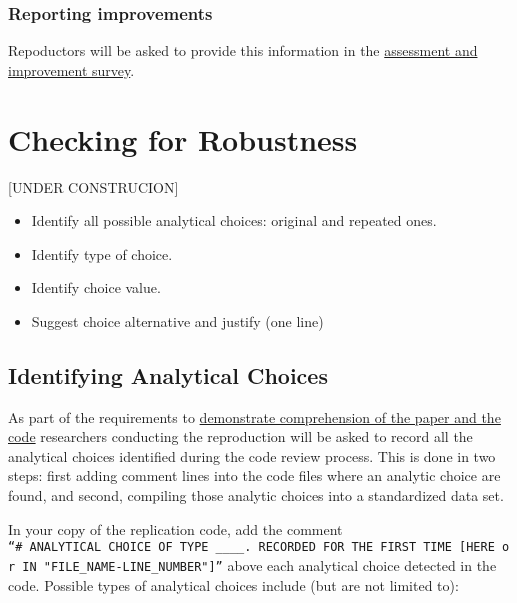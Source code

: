 \documentclass[]{book}
\providecommand{\tightlist}{%
  \setlength{\itemsep}{0pt}\setlength{\parskip}{0pt}}
\begin{document}
\hypertarget{reporting-improvements}{%
\subsection{Reporting improvements}\label{reporting-improvements}}

Repoductors will be asked to provide this information in the \href{ADD\%20LINK}{assessment and improvement survey}.

\hypertarget{robust}{%
\chapter{Checking for Robustness}\label{robust}}

{[}UNDER CONSTRUCION{]}

\begin{itemize}
\tightlist
\item
  Identify all possible analytical choices: original and repeated ones.\\
\item
  Identify type of choice.\\
\item
  Identify choice value.
\item
  Suggest choice alternative and justify (one line)
\end{itemize}

\hypertarget{identifying-analytical-choices}{%
\section{Identifying Analytical Choices}\label{identifying-analytical-choices}}

As part of the requirements to \href{requirements_comprehension.md}{demonstrate comprehension of the paper and the code} researchers conducting the reproduction will be asked to record all the analytical choices identified during the code review process. This is done in two steps: first adding comment lines into the code files where an analytic choice are found, and second, compiling those analytic choices into a standardized data set.

In your copy of the replication code, add the comment \texttt{“\#\ ANALYTICAL\ CHOICE\ OF\ TYPE\ \_\_\_\_.\ RECORDED\ FOR\ THE\ FIRST\ TIME\ {[}HERE\ or\ IN\ "FILE\_NAME-LINE\_NUMBER"{]}”} above each analytical choice detected in the code. Possible types of analytical choices include (but are not limited to):
\end{document}
